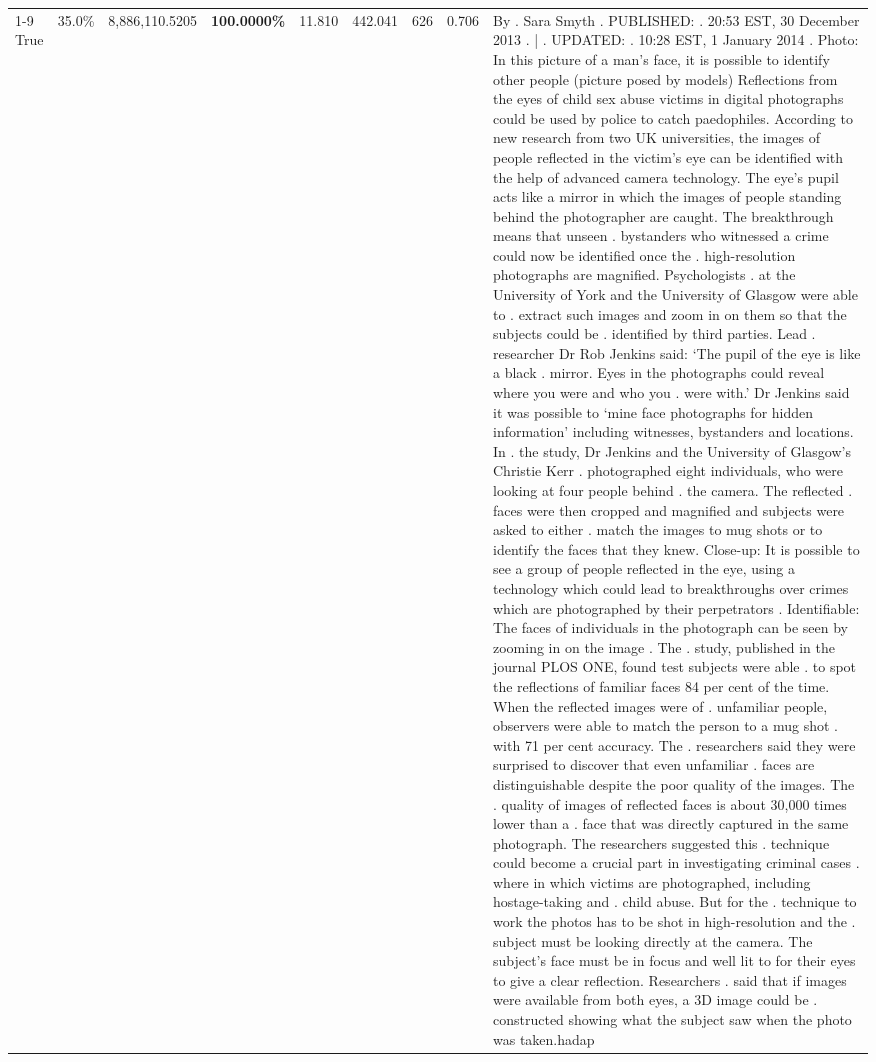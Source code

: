 \begin{table}[H]
\begin{tabular}{lllrlllll}
\cline{1-9}
True & 35.0\% & 8,886,110.5205 & \bfseries \color{red} 100.0000\% & 11.810 & 442.041 & 626 & 0.706 & By . Sara Smyth . PUBLISHED: . 20:53 EST, 30 December 2013 . | . UPDATED: . 10:28 EST, 1 January 2014 . Photo: In this picture of a man's face, it is possible to identify other people (picture posed by models) Reflections from the eyes of child sex abuse victims in digital photographs could be used by police to catch paedophiles. According to new research from two UK universities, the images of people reflected in the victim's eye can be identified with the help of advanced camera technology. The eye's pupil acts like a mirror in which the images of people standing behind the photographer are caught. The breakthrough means that unseen . bystanders who witnessed a crime could now be identified once the . high-resolution photographs are magnified. Psychologists . at the University of York and the University of Glasgow were able to . extract such images and zoom in on them so that the subjects could be . identified by third parties. Lead . researcher Dr Rob Jenkins said: ‘The pupil of the eye is like a black . mirror. Eyes in the photographs could reveal where you were and who you . were with.' Dr Jenkins said it was possible to ‘mine face photographs for hidden information' including witnesses, bystanders and locations. In . the study, Dr Jenkins and the University of Glasgow's Christie Kerr . photographed eight individuals, who were looking at four people behind . the camera. The reflected . faces were then cropped and magnified and subjects were asked to either . match the images to mug shots or to identify the faces that they knew. Close-up: It is possible to see a group of people reflected in the eye, using a technology which could lead to breakthroughs over crimes which are photographed by their perpetrators . Identifiable: The faces of individuals in the photograph can be seen by zooming in on the image . The . study, published in the journal PLOS ONE, found test subjects were able . to spot the reflections of familiar faces 84 per cent of the time. When the reflected images were of . unfamiliar people, observers were able to match the person to a mug shot . with 71 per cent accuracy. The . researchers said they were surprised to discover that even unfamiliar . faces are distinguishable despite the poor quality of the images. The . quality of images of reflected faces is about 30,000 times lower than a . face that was directly captured in the same photograph. The researchers suggested this . technique could become a crucial part in investigating criminal cases . where in which victims are photographed, including hostage-taking and . child abuse. But for the . technique to work the photos has to be shot in high-resolution and the . subject must be looking directly at the camera. The subject's face must be in focus and well lit to for their eyes to give a clear reflection. Researchers . said that if images were available from both eyes, a 3D image could be . constructed showing what the subject saw when the photo was taken.hadap \\

\end{tabular}
\end{table}
